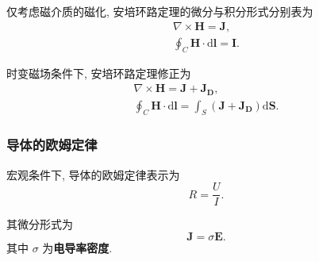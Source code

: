 仅考虑磁介质的磁化, 安培环路定理的微分与积分形式分别表为
\begin{gather}
    \nabla\times\bm{H}=\bm{J}, \\
    \oint_C\bm{H}\cdot\mathrm{d}\bm{l}=\bm{I}.
\end{gather}

时变磁场条件下, 安培环路定理修正为
\begin{gather}
    \nabla\times\bm{H}=\bm{J}+\bm{J_D}, \label{eq:2.5 nabla times H} \\
    \oint_C\bm{H}\cdot\mathrm{d}\bm{l}=\int_S(\bm{J}+\bm{J_D})\mathrm{d}\bm{S}.
\end{gather}

\subsubsection{导体的欧姆定律}
宏观条件下, 导体的欧姆定律表示为
\begin{equation} \label{eq:2.5 ohm}
    R=\frac{U}{I}.
\end{equation}

其微分形式为
\begin{equation}
    \bm{J}=\sigma\bm{E}.
\end{equation}
其中 $\sigma$ 为\textbf{电导率密度}.
